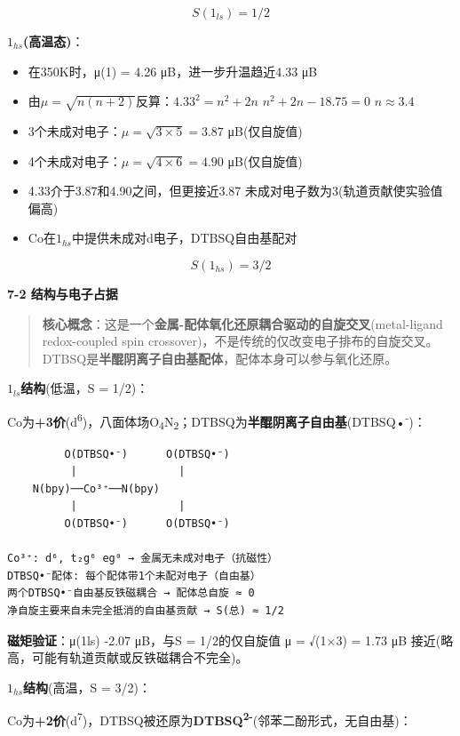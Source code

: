 \[\boxed{S(1_{ls}) = 1/2}\]

\textbf{\(1_{hs}\)(高温态)}：

\begin{itemize}
\tightlist
\item
  在350K时，μ(1) = 4.26 μB，进一步升温趋近4.33 μB
\item
  由\(\mu = \sqrt{n(n+2)}\)反算：\(4.33^2 = n^2 + 2n\) \箭 \(n^2 + 2n - 18.75 = 0\) \箭 \(n \approx 3.4\)
\item
  3个未成对电子：\(\mu = \sqrt{3 \times 5} = 3.87\) μB(仅自旋值)
\item
  4个未成对电子：\(\mu = \sqrt{4 \times 6} = 4.90\) μB(仅自旋值)
\item
  4.33介于3.87和4.90之间，但更接近3.87 \箭 未成对电子数为3(轨道贡献使实验值偏高)
\item
  Co在\(1_{hs}\)中提供未成对d电子，DTBSQ自由基配对
\end{itemize}

\[\boxed{S(1_{hs}) = 3/2}\]

\textbf{7-2 结构与电子占据}

\begin{quote}
\textbf{核心概念}：这是一个\textbf{金属-配体氧化还原耦合驱动的自旋交叉}(metal-ligand redox-coupled spin crossover)，不是传统的仅改变电子排布的自旋交叉。DTBSQ是\textbf{半醌阴离子自由基配体}，配体本身可以参与氧化还原。
\end{quote}

\textbf{\(1_{ls}\)结构}(低温，S = 1/2)：

Co为\textbf{+3价}(d\textsuperscript{6})，八面体场O\textsubscript{4}N\textsubscript{2}；DTBSQ为\textbf{半醌阴离子自由基}(DTBSQ•\textsuperscript{-})：

\begin{verbatim}
         O(DTBSQ•⁻)      O(DTBSQ•⁻)
          |                |
    N(bpy)──Co³⁺──N(bpy)
          |                |
         O(DTBSQ•⁻)      O(DTBSQ•⁻)

Co³⁺: d⁶, t₂g⁶ eg⁰ → 金属无未成对电子（抗磁性）
DTBSQ•⁻配体: 每个配体带1个未配对电子（自由基）
两个DTBSQ•⁻自由基反铁磁耦合 → 配体总自旋 ≈ 0
净自旋主要来自未完全抵消的自由基贡献 → S(总) ≈ 1/2
\end{verbatim}

\textbf{磁矩验证}：μ(1ls) -2.07 μB，与S = 1/2的仅自旋值 μ = √(1×3) = 1.73 μB 接近(略高，可能有轨道贡献或反铁磁耦合不完全)。

\textbf{\(1_{hs}\)结构}(高温，S = 3/2)：

Co为\textbf{+2价}(d\textsuperscript{7})，DTBSQ被还原为\textbf{DTBSQ\textsuperscript{2-}}(邻苯二酚形式，无自由基)：

